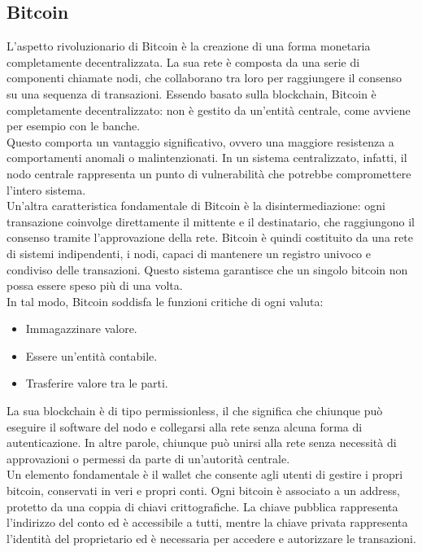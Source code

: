 \subsection{Bitcoin}

L’aspetto rivoluzionario di Bitcoin è la creazione di una forma monetaria completamente decentralizzata. La sua rete è composta da una serie di componenti chiamate nodi, che collaborano tra loro per raggiungere il consenso su una sequenza di transazioni.
Essendo basato sulla blockchain, Bitcoin è completamente decentralizzato: non è gestito da un’entità centrale, come avviene per esempio con le banche. 
\\Questo comporta un vantaggio significativo, ovvero una maggiore resistenza a comportamenti anomali o malintenzionati. In un sistema centralizzato, infatti, il nodo centrale rappresenta un punto di vulnerabilità che potrebbe compromettere l’intero sistema.
\\Un’altra caratteristica fondamentale di Bitcoin è la disintermediazione: ogni transazione coinvolge direttamente il mittente e il destinatario, che raggiungono il consenso tramite l’approvazione della rete. Bitcoin è quindi costituito da una rete di sistemi indipendenti, i nodi, capaci di mantenere un registro univoco e condiviso delle transazioni. Questo sistema garantisce che un singolo bitcoin non possa essere speso più di una volta.\\
In tal modo, Bitcoin soddisfa le funzioni critiche di ogni valuta:
\begin{itemize}
\item Immagazzinare valore.
\item Essere un’entità contabile.
\item Trasferire valore tra le parti.
\end{itemize}
La sua blockchain è di tipo permissionless, il che significa che chiunque può eseguire il software del nodo e collegarsi alla rete senza alcuna forma di autenticazione. In altre parole, chiunque può unirsi alla rete senza necessità di approvazioni o permessi da parte di un’autorità centrale.
\\Un elemento fondamentale è il wallet che consente agli utenti di gestire i propri bitcoin, conservati in veri e propri conti. Ogni bitcoin è associato a un address, protetto da una coppia di chiavi crittografiche.
La chiave pubblica rappresenta l’indirizzo del conto ed è accessibile a tutti, mentre la chiave privata rappresenta l’identità del proprietario ed è necessaria per accedere e autorizzare le transazioni.
